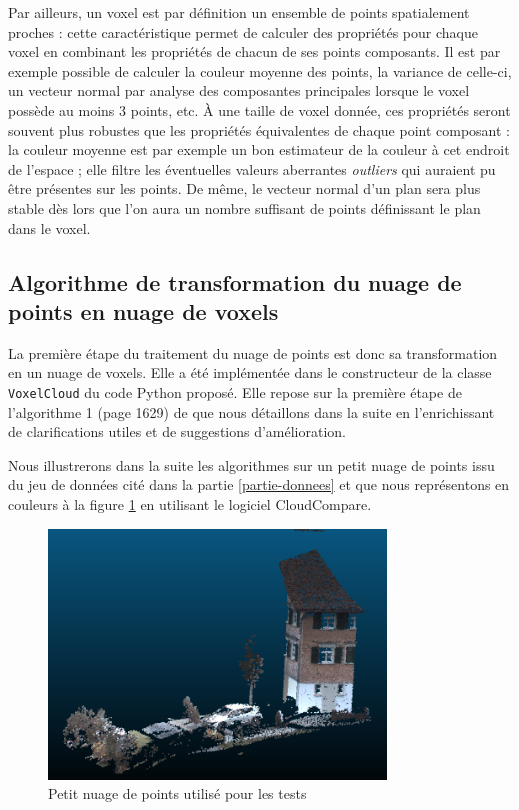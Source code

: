 \documentclass[a4paper, onecolumn, 11pt]{article}
\begin{document}
Par ailleurs, un voxel est par définition un ensemble de points spatialement proches : cette caractéristique permet de calculer des propriétés pour chaque voxel en combinant les propriétés de chacun de ses points composants. Il est par exemple possible de calculer la couleur moyenne des points, la variance de celle-ci, un vecteur normal par analyse des composantes principales lorsque le voxel possède au moins 3 points, etc. À une taille de voxel donnée, ces propriétés seront souvent plus robustes que les propriétés équivalentes de chaque point composant : la couleur moyenne est par exemple un bon estimateur de la couleur à cet endroit de l'espace ; elle filtre les éventuelles valeurs aberrantes \emph{outliers} qui auraient pu être présentes sur les points. De même, le vecteur normal d'un plan sera plus stable dès lors que l'on aura un nombre suffisant de points définissant le plan dans le voxel.

\subsection{Algorithme de transformation du nuage de points en nuage de voxels}
\label{partie-algo-voxels}
La première étape du traitement du nuage de points est donc sa transformation en un nuage de voxels. Elle a été implémentée dans le constructeur de la classe \texttt{VoxelCloud} du code Python proposé. Elle repose sur la première étape de l'algorithme 1 (page 1629) de \cite{aka_article} que nous détaillons dans la suite en l'enrichissant de clarifications utiles et de suggestions d'amélioration.

Nous illustrerons dans la suite les algorithmes sur un petit nuage de points issu du jeu de données cité dans la partie \ref{partie-donnees} et que nous représentons en couleurs à la figure \ref{fig:smallcloud} en utilisant le logiciel CloudCompare.

\begin{figure}[h]
    \centering
    \includegraphics[width=0.8\textwidth]{fig/smallcloud_0.png}
    \caption{Petit nuage de points utilisé pour les tests}
    \label{fig:smallcloud}
\end{figure}
\end{document}
